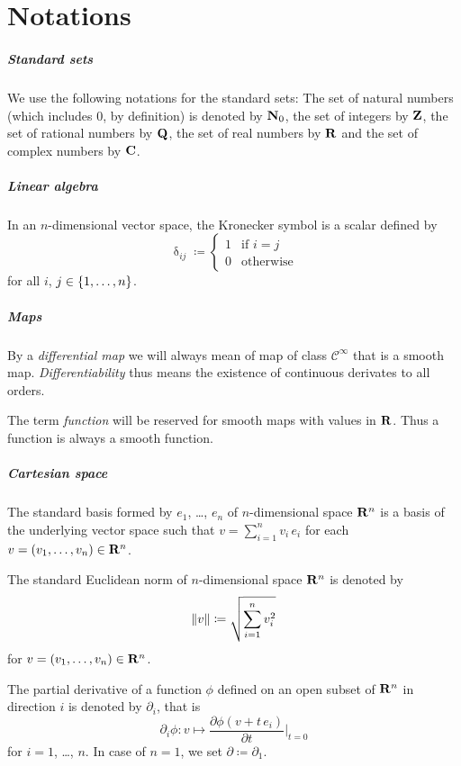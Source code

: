 \chapter*{Notations}

\paragraph{Standard sets}
We use the following notations for the standard sets: The set of natural
numbers (which includes $0$, by definition) is denoted by $\mathbf{N}_0$, the set
of integers by $\mathbf{Z}$, the set of rational numbers by $\mathbf{Q}$, the set of
real numbers by $\mathbf{R}$ and the set of complex numbers by $\mathbf{C}$.

\paragraph{Linear algebra}

In an $n$-dimensional vector space, the Kronecker symbol is a scalar defined by 
\[
  \updelta_{ij} \coloneqq \begin{cases}
    1 & \text{if $i = j$} \\
    0 & \text{otherwise}
  \end{cases}
\]
for all $i$, $j \in \lbrace1, \dotsc, n\rbrace$.

\paragraph{Maps}

By a \emph{differential map} we will always mean of map of class $\mathcal C^\infty$
that is a smooth map. \emph{Differentiability} thus means the existence of
continuous derivates to all orders.

The term \emph{function} will be reserved for smooth maps with values in $\mathbf{R}$.
Thus a function is always a smooth function.

\paragraph{Cartesian space}
The standard basis formed by $e_1$, \dots, $e_n$ of $n$-dimensional space $\mathbf{R}^n$ is
a basis of the underlying vector space such that $v = \sum_{i = 1}^n v_i \, e_i
$ for each $v = (v_1, \dotsc, v_n) \in \mathbf{R}^n$. 

The standard Euclidean norm of $n$-dimensional space $\mathbf{R}^n$ is denoted
by
\[
    \lVert v\rVert \coloneqq \sqrt{\sum_{i = 1}^n v_i^2}
\]
for $v = (v_1, \dotsc, v_n) \in \mathbf{R}^n$.

The partial derivative of a function $\phi$ defined on an open subset of $\mathbf{R}^n$
in direction $i$ is denoted by $\partial_i$, that is
\[
  \partial_i \phi\colon v \mapsto \frac{\partial \phi(v + t \, e_i)}{\partial t}|_{t = 0}
\]
for $i = 1$, \dots, $n$. In case of $n = 1$, we set $\partial \coloneqq \partial_1$.
